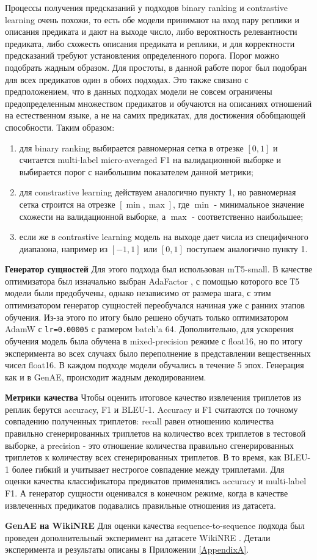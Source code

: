 Процессы получения предсказаний у подходов binary ranking и contrastive learning очень похожи, то есть обе модели принимают на вход пару реплики и описания предиката и дают на выходе число, либо вероятность релевантности предиката, либо схожесть описания предиката и реплики, и для корректности предсказаний требуют установления определенного порога. Порог можно подобрать жадным образом. Для простоты, в данной работе порог был подобран для всех предикатов один в обоих подходах. Это также связано с предположением, что в данных подходах модели не совсем ограничены предопределенным множеством предикатов и обучаются на описаниях отношений на естественном языке, а не на самих предикатах, для достижения обобщающей способности. Таким образом:

\begin{enumerate}
    \item для binary ranking выбирается равномерная сетка в отрезке $[0, 1]$ и считается multi-label micro-averaged F1 на валидационной выборке и выбирается порог с наибольшим показателем данной метрики;
    \item для constrastive learning действуем аналогично пункту 1, но равномерная сетка строится на отрезке $[\min, \max]$, где $\min$ - минимальное значение схожести на валидационной выборке, а $\max$ - соответственно наибольшее;
    \item если же в contrastive learning модель на выходе дает числа из специфичного диапазона, например из $[-1, 1]$ или $[0, 1]$ поступаем аналогично пункту 1.
\end{enumerate}

\textbf{Генератор сущностей}    Для этого подхода был использован mT5-small. В качестве оптимизатора был изначально выбран AdaFactor \cite{adafactor}, с помощью которого все Т5 модели были предобучены, однако независимо от размера шага, с этим оптимизатором генератор сущностей переобучался начиная уже с ранних этапов обучения. Из-за этого по итогу было решено обучать только оптимизатором AdamW с \texttt{lr=0.00005} с размером batch'a 64. Дополнительно, для ускорения обучения модель была обучена в mixed-precision режиме с float16, но по итогу эксперимента во всех случаях было переполнение в представлении вещественных чисел float16. В каждом подходе модели обучались в течение 5 эпох. Генерация как и в GenAE, происходит жадным декодированием.

\textbf{Метрики качества}   Чтобы оценить итоговое качество извлечения триплетов из реплик берутся accuracy, F1 и BLEU-1. Accuracy и F1 считаются по точному совпадению полученных триплетов: recall равен отношению количества правильно сгенерированных триплетов на количество всех триплетов в тестовой выборке, а precision - это отношение количества правильно сгенерированных триплетов к количеству всех сгенерированных триплетов. В то время, как BLEU-1 более гибкий и учитывает нестрогое совпадение между триплетами. 
Для оценки качества классификатора предикатов применялись accuracy и multi-label F1. А генератор сущности оценивался в конечном режиме, когда в качестве извлеченных предикатов подавались правильные отношения из датасета.

\textbf{GenAE на WikiNRE}   Для оценки качества sequence-to-sequence подхода был проведен дополнительный эксперимент на датасете WikiNRE \cite{trisedya-etal-2019-neural}. Детали эксперимента и результаты описаны в Приложении \ref{AppendixA}.

